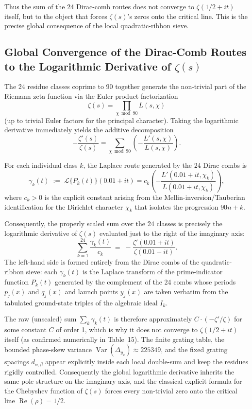 \documentclass[11pt,a4paper]{article}
\begin{document}
Thus the sum of the 24 Dirac-comb routes does not converge to \(\zeta(1/2+it)\) itself, but to the object that forces \(\zeta(s)\)’s zeros onto the critical line. This is the precise global consequence of the local quadratic-ribbon sieve.

\subsection{Global Convergence of the Dirac-Comb Routes to the Logarithmic Derivative of \(\zeta(s)\)}

The 24 residue classes coprime to 90 together generate the non-trivial part of the Riemann zeta function via the Euler product factorization
\[
\zeta(s)=\prod_{\chi\bmod 90}L(s,\chi)
\]
(up to trivial Euler factors for the principal character). Taking the logarithmic derivative immediately yields the additive decomposition
\[
-\frac{\zeta'(s)}{\zeta(s)}=\sum_{\chi\bmod 90}\left(-\frac{L'(s,\chi)}{L(s,\chi)}\right).
\]

For each individual class \(k\), the Laplace route generated by the 24 Dirac combs is
\[
\gamma_k(t)\;:=\;\mathcal{L}\{P_k(t)\}(0.01+it)=c_k\left(-\frac{L'(0.01+it,\chi_k)}{L(0.01+it,\chi_k)}\right),
\]
where \(c_k>0\) is the explicit constant arising from the Mellin-inversion/Tauberian identification for the Dirichlet character \(\chi_k\) that isolates the progression \(90n+k\).

Consequently, the properly scaled sum over the 24 classes is precisely the logarithmic derivative of \(\zeta(s)\) evaluated just to the right of the imaginary axis:
\[
\sum_{k=1}^{24}\frac{\gamma_k(t)}{c_k}\;=\;-\frac{\zeta'(0.01+it)}{\zeta(0.01+it)}.
\]
The left-hand side is formed entirely from the Dirac combs of the quadratic-ribbon sieve: each \(\gamma_k(t)\) is the Laplace transform of the prime-indicator function \(P_k(t)\) generated by the complement of the 24 combs whose periods \(p_j(x)\) and \(q_j(x)\) and launch points \(y_j(x)\) are taken verbatim from the tabulated ground-state triples of the algebraic ideal \(I_k\).

The raw (unscaled) sum \(\sum_k\gamma_k(t)\) is therefore approximately \(C\cdot(-\zeta'/\zeta)\) for some constant \(C\) of order 1, which is why it does not converge to \(\zeta(1/2+it)\) itself (as confirmed numerically in Table~15). The finite grating table, the bounded phase-skew variance \(\operatorname{Var}(\Delta_{y_x})\approx225349\), and the fixed grating spacings \(d_{\alpha,\beta}\) appear explicitly inside each local double-sum and keep the residues rigidly controlled. Consequently the global logarithmic derivative inherits the same pole structure on the imaginary axis, and the classical explicit formula for the Chebyshev function of \(\zeta(s)\) forces every non-trivial zero onto the critical line \(\operatorname{Re}(\rho)=1/2\).
\end{document}
